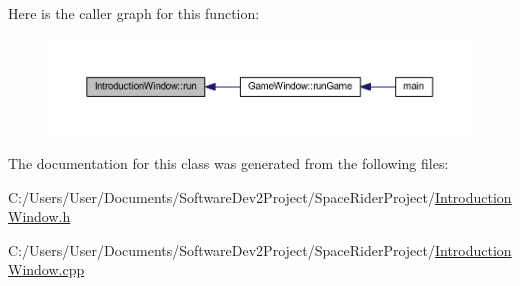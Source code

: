 Here is the caller graph for this function\+:\nopagebreak
\begin{figure}[H]
\begin{center}
\leavevmode
\includegraphics[width=350pt]{class_introduction_window_a18d9a74bc2c18827a8e45758b148f8d7_icgraph}
\end{center}
\end{figure}


The documentation for this class was generated from the following files\+:\begin{DoxyCompactItemize}
\item 
C\+:/\+Users/\+User/\+Documents/\+Software\+Dev2\+Project/\+Space\+Rider\+Project/\hyperlink{_introduction_window_8h}{Introduction\+Window.\+h}\item 
C\+:/\+Users/\+User/\+Documents/\+Software\+Dev2\+Project/\+Space\+Rider\+Project/\hyperlink{_introduction_window_8cpp}{Introduction\+Window.\+cpp}\end{DoxyCompactItemize}
